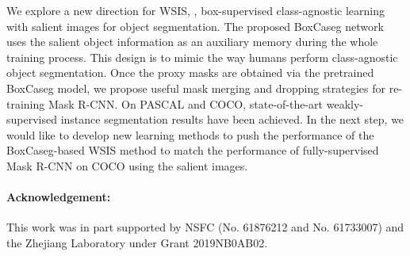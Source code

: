 \documentclass[final]{cvpr}
\begin{document}
We explore a new direction for WSIS, \ie, box-supervised class-agnostic learning with salient images for object segmentation. The proposed BoxCaseg network uses the salient object information as an auxiliary memory during the whole training process. This design is to mimic the way humans perform class-agnostic object segmentation. Once the proxy masks are obtained via the pretrained BoxCaseg model, we propose useful mask merging and dropping strategies for re-training Mask R-CNN. On PASCAL and COCO, state-of-the-art weakly-supervised instance segmentation results have been achieved. In the next step, we would like to develop new learning methods to push the performance of the BoxCaseg-based WSIS method to match the performance of fully-supervised Mask R-CNN on COCO using the  salient images.

\vspace{-3mm}
{\small \paragraph{Acknowledgement:} This work was in part supported by NSFC (No. 61876212 and No. 61733007) and the Zhejiang Laboratory under Grant 2019NB0AB02.}

{\small


}
\end{document}
